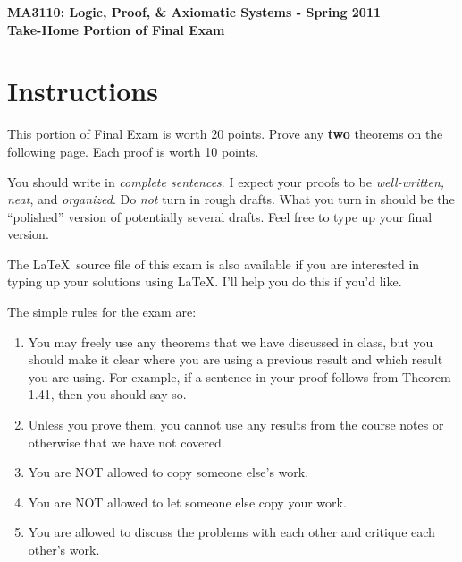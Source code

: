 \documentclass[11pt]{article}
\theoremstyle{definition}
\begin{document}
\begin{center}

{\Large\bf MA3110: Logic, Proof, \& Axiomatic Systems - Spring 2011}\\
\smallskip
{\Large\bf Take-Home Portion of Final Exam}

\bigskip


\end{center}

\setlength{\fboxsep}{10pt}

\section*{Instructions}

This portion of Final Exam is worth 20 points.  Prove any \textbf{two} theorems on the following page.  Each proof is worth 10 points.

\bigskip

You should write in \emph{complete sentences}.  I expect your proofs to be \emph{well-written, neat}, and \emph{organized}.  Do \emph{not} turn in rough drafts.  What you turn in should be the ``polished'' version of potentially several drafts.  Feel free to type up your final version.  

\bigskip

The \LaTeX\ source file of this exam is also available if you are interested in typing up your solutions using \LaTeX.  I'll help you do this if you'd like.

\bigskip

The simple rules for the exam are:

\begin{enumerate}
\item You may freely use any theorems that we have discussed in class, but you should make it clear where you are using a previous result and which result you are using.  For example, if a sentence in your proof follows from Theorem 1.41, then you should say so.
\item Unless you prove them, you cannot use any results from the course notes or otherwise that we have not covered.
\item You are NOT allowed to copy someone else's work.
\item You are NOT allowed to let someone else copy your work.
\item You are allowed to discuss the problems with each other and critique each other's work.
\end{enumerate}
\end{document}
